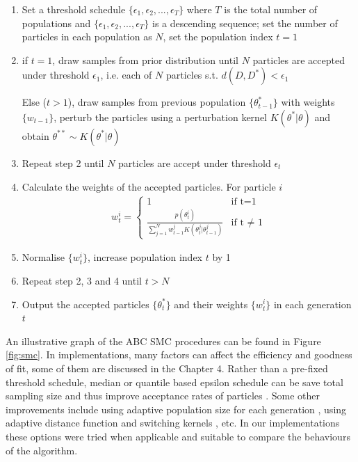 \begin{enumerate}
    \item Set a threshold schedule $\{\epsilon_1, \epsilon_2, ..., \epsilon_T\}$ where $T$ is the total number of populations and $\{\epsilon_1, \epsilon_2, ..., \epsilon_T\}$ is a descending sequence; set the number of particles in each population as $N$, set the population index $t=1$
    \item if $t=1$, draw samples from prior distribution until $N$ particles are accepted under threshold $\epsilon_1$, i.e. each of $N$ particles s.t. $d(D,D^*)<\epsilon_1$
    
    Else ($t>1$), draw samples from previous population $\{\theta^*_{t-1}\}$ with weights $\{w_{t-1}\}$, perturb the particles using a perturbation kernel $K(\theta^*|\theta)$ and obtain $\theta^{**}\sim K(\theta^*|\theta)$
    \item Repeat step 2 until $N$ particles are accept under threshold $\epsilon_t$
    \item Calculate the weights of the accepted particles. For particle $i$ 
    \begin{align}
        \label{eq:weight}
        w^i_t =\begin{cases}
            1 & \text{if t=1} \\
            \frac{p(\theta^i_t)}{\sum_{j=1}^{N} w^j_{t-1}K(\theta^j_t|\theta^j_{t-1})} & \text{if t $\neq$ 1} 
        \end{cases}
    \end{align}
    
    \item Normalise $\{w^i_t\}$, increase population index $t$ by 1
    \item Repeat step 2, 3 and 4 until $t>N$
    \item Output the accepted particles $\{\theta^*_{t}\}$ and their weights $\{w^i_t\}$ in each generation $t$

\end{enumerate}

An illustrative graph of the ABC SMC procedures can be found in Figure \ref{fig:smc}. In implementations, many factors can affect the efficiency and goodness of fit, some of them are discussed in the Chapter 4. Rather than a pre-fixed threshold schedule, median or quantile based epsilon schedule can be save total sampling size and thus improve acceptance rates of particles \cite{threshold}. Some other improvements include using adaptive population size for each generation \cite{population}, using adaptive distance function \cite{ref:adpt_dis} and switching kernels \cite{ref:kernel}, etc. In our implementations these options were tried when applicable and suitable to compare the behaviours of the algorithm.

